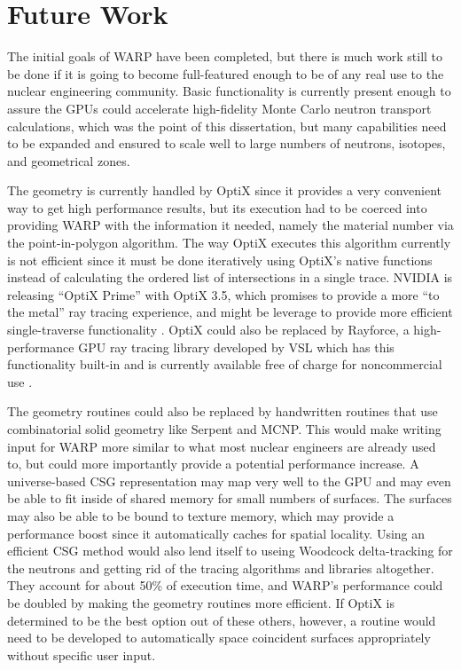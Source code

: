 \section{Future Work}

The initial goals of WARP have been completed, but there is much work still to be done if it is going to become full-featured enough to be of any real use to the nuclear engineering community.  Basic functionality is currently present enough to assure the GPUs could accelerate high-fidelity Monte Carlo neutron transport calculations, which was the point of this dissertation, but many capabilities need to be expanded and ensured to scale well to large numbers of neutrons, isotopes, and geometrical zones.

The geometry is currently handled by OptiX since it provides a very convenient way to get high performance results, but its execution had to be coerced into providing WARP with the information it needed, namely the material number via the point-in-polygon algorithm.  The way OptiX executes this algorithm currently is not efficient since it must be done iteratively using OptiX's native functions instead of calculating the ordered list of intersections in a single trace.  NVIDIA is releasing ``OptiX Prime'' with OptiX 3.5, which promises to provide a more ``to the metal'' ray tracing experience, and might be leverage to provide more efficient single-traverse functionality \cite{optix3.5}.  OptiX could also be replaced by Rayforce, a high-performance GPU ray tracing library developed by VSL which has this functionality built-in and is currently available free of charge for noncommercial use \cite{rayforce}.

The geometry routines could also be replaced by handwritten routines that use combinatorial solid geometry like Serpent and MCNP.  This would make writing input for WARP more similar to what most nuclear engineers are already used to, but could more importantly provide a potential performance increase.  A universe-based CSG representation may map very well to the GPU and may even be able to fit inside of shared memory for small numbers of surfaces.  The surfaces may also be able to be bound to texture memory, which may provide a performance boost since it automatically caches for spatial locality.  Using an efficient CSG method would also lend itself to useing Woodcock delta-tracking for the neutrons and getting rid of the tracing algorithms and libraries altogether.  They account for about 50\% of execution time, and WARP's performance could be doubled by making the geometry routines more efficient.  If OptiX is determined to be the best option out of these others, however, a routine would need to be developed to automatically space coincident surfaces appropriately without specific user input.

